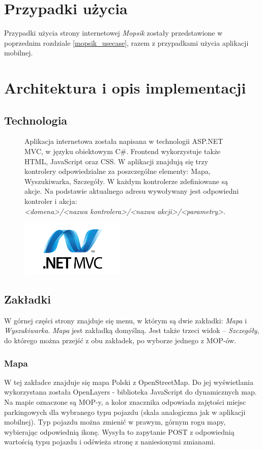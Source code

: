 \section{Przypadki użycia}
Przypadki użycia strony internetowej \textit{Mopsik} zostały przedstawione w poprzednim rozdziale \ref{mopsik_usecase}, razem z przypadkami użycia aplikacji mobilnej.

\section{Architektura i opis implementacji}

\subsection{Technologia}
\begin{figure}[!htb]
    \centering
    \begin{minipage}{.7\textwidth}
Aplikacja internetowa została napisana w technologii ASP.NET MVC, w języku obiektowym C\#. Frontend wykorzystuje także HTML, JavaScript oraz CSS. W aplikacji znajdują się trzy kontrolery odpowiedzialne za poszczególne elementy: Mapa, Wyszukiwarka, Szczegóły. W każdym kontrolerze zdefiniowane są akcje. Na podstawie aktualnego adresu wywoływany jest odpowiedni kontroler i akcja:\\ \textit{<domena>/<nazwa kontrolera>/<nazwa akcji>/<parametry>}.
    \end{minipage}%
    \begin{minipage}{.3\textwidth}
        \centering
        \includegraphics[width=5cm]{images/mvc.png}\label{MVC_logo}
    \end{minipage}
\end{figure}

\subsection{Zakładki}
W górnej części strony znajduje się menu, w którym są dwie zakładki: \textit{Mapa} i \textit{Wyszukiwarka}. \textit{Mapa} jest zakładką domyślną. Jest także trzeci widok -- \textit{Szczegóły}, do którego można przejść z obu zakładek, po wyborze jednego z MOP-ów.
\subsubsection{Mapa}
W tej zakładce znajduje się mapa Polski z OpenStreetMap\cite{osm}. Do jej wyświetlania wykorzystana została OpenLayers - biblioteka JavaScript do dynamicznych map. Na mapie oznaczone są MOP-y, a kolor znacznika odpowiada zajętości miejsc parkingowych dla wybranego typu pojazdu (skala analogiczna jak w aplikacji mobilnej). Typ pojazdu można zmienić w prawym, górnym rogu mapy, wybierając odpowiednią ikonę. Wysyła to zapytanie POST z odpowiednią wartością typu pojazdu i odświeża stronę z naniesionymi zmianami. 

